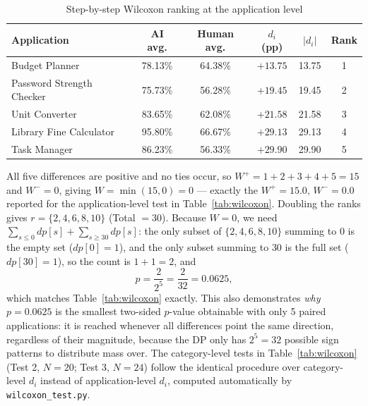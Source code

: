 \documentclass[12pt,a4paper]{article}
\begin{document}
\begin{table}[H]
\centering
\caption{Step-by-step Wilcoxon ranking at the application level}
\label{tab:wilcoxon-worked}
\small
\begin{tabular}{lccccc}
\toprule
\textbf{Application} & \textbf{AI avg.} & \textbf{Human avg.} & \textbf{$d_i$ (pp)} & \textbf{$|d_i|$} & \textbf{Rank} \\
\midrule
Budget Planner            & 78.13\% & 64.38\% & $+13.75$ & 13.75 & 1 \\
Password Strength Checker & 75.73\% & 56.28\% & $+19.45$ & 19.45 & 2 \\
Unit Converter             & 83.65\% & 62.08\% & $+21.58$ & 21.58 & 3 \\
Library Fine Calculator    & 95.80\% & 66.67\% & $+29.13$ & 29.13 & 4 \\
Task Manager                & 86.23\% & 56.33\% & $+29.90$ & 29.90 & 5 \\
\bottomrule
\end{tabular}
\end{table}

All five differences are positive and no ties occur, so $W^+ = 1{+}2{+}3{+}4{+}5 = 15$ and $W^- = 0$, giving $W = \min(15,0) = 0$ --- exactly the $W^+=15.0,\,W^-=0.0$ reported for the application-level test in Table~\ref{tab:wilcoxon}. Doubling the ranks gives $r = \{2,4,6,8,10\}$ (Total $=30$). Because $W=0$, we need $\sum_{s\le 0} dp[s] + \sum_{s\ge 30} dp[s]$: the only subset of $\{2,4,6,8,10\}$ summing to $0$ is the empty set ($dp[0]=1$), and the only subset summing to $30$ is the full set ($dp[30]=1$), so the count is $1+1=2$, and
\begin{equation}
    p = \frac{2}{2^{5}} = \frac{2}{32} = 0.0625,
\end{equation}
which matches Table~\ref{tab:wilcoxon} exactly. This also demonstrates \emph{why} $p=0.0625$ is the smallest two-sided $p$-value obtainable with only 5 paired applications: it is reached whenever all differences point the same direction, regardless of their magnitude, because the DP only has $2^5=32$ possible sign patterns to distribute mass over. The category-level tests in Table~\ref{tab:wilcoxon} (Test 2, $N{=}20$; Test 3, $N{=}24$) follow the identical procedure over category-level $d_i$ instead of application-level $d_i$, computed automatically by \texttt{wilcoxon\_test.py}.
\end{document}
